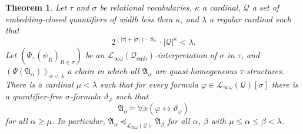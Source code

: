 \documentclass{ndjflart}
\theoremstyle{plain}
\newtheorem{theorem}[conjecture]{Theorem}
\theoremstyle{definition}
\numberwithin{equation}{section}
\DeclareMathOperator{\emb}{emb}
\begin{document}
\begin{theorem}\label{infinite}
Let $\tau$ and $\sigma$ be relational vocabularies, $\kappa$ a cardinal,
$\mathcal{Q}$ a set of embedding-closed quantifiers of width less than $\kappa$,
and $\lambda$ a regular cardinal such that
\[
	2^{(|\tau| + |\sigma|) \cdot \aleph_0} \cdot |\mathcal{Q}|^{\kappa} < \lambda.
\]
Let $(\Psi, (\psi_R)_{R \in \sigma})$ be an
$\mathcal{L}_{\infty \omega}(\mathcal{Q}_{\emb})$-interpretation of
$\sigma$ in $\tau$, and $(\Psi(\mathfrak{A}_{\alpha}))_{\alpha < \lambda}$
a chain in which all $\mathfrak{A}_{\alpha}$ are quasi-homogeneous
$\tau$-structures.
There is a cardinal $\mu<\lambda$ such that for every formula
$\varphi \in \mathcal{L}_{\infty\omega}(\mathcal{Q})[\sigma]$
there is a quantifier-free
$\sigma$-formula $\vartheta_{\varphi}$ such that
\[
	\mathfrak{A}_{\alpha} \vDash \forall \overline{x}(\varphi
	\leftrightarrow \vartheta_{\varphi})
\]
for all $\alpha \geq \mu$.
In particular,
$\mathfrak{A}_{\alpha} \preceq_{\mathcal{L}_{\infty\omega}(\mathcal{Q})}
\mathfrak{A}_{\beta}$
for all $\alpha$, $\beta$ with $\mu \leq \alpha \leq \beta < \lambda$.
\end{theorem}
\end{document}
